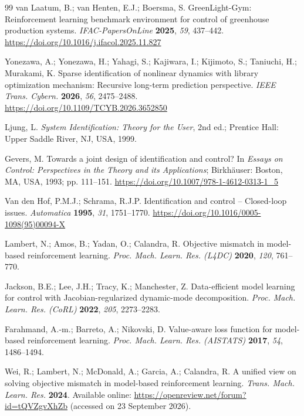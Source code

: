 \begin{thebibliography}{99}
van Laatum, B.; van Henten, E.J.; Boersma, S. GreenLight-Gym: Reinforcement learning
benchmark environment for control of greenhouse production systems.
\textit{IFAC-PapersOnLine} \textbf{2025}, \textit{59}, 437--442.
\url{https://doi.org/10.1016/j.ifacol.2025.11.827}

Yonezawa, A.; Yonezawa, H.; Yahagi, S.; Kajiwara, I.; Kijimoto, S.; Taniuchi, H.;
Murakami, K. Sparse identification of nonlinear dynamics with library optimization mechanism:
Recursive long-term prediction perspective. \textit{IEEE Trans. Cybern.} \textbf{2026},
\textit{56}, 2475--2488. \url{https://doi.org/10.1109/TCYB.2026.3652850}

Ljung, L. \textit{System Identification: Theory for the User}, 2nd ed.; Prentice Hall:
Upper Saddle River, NJ, USA, 1999.

Gevers, M. Towards a joint design of identification and control? In \textit{Essays on
Control: Perspectives in the Theory and its Applications}; Birkh\"auser: Boston, MA, USA,
1993; pp. 111--151. \url{https://doi.org/10.1007/978-1-4612-0313-1_5}

Van den Hof, P.M.J.; Schrama, R.J.P. Identification and control -- Closed-loop issues.
\textit{Automatica} \textbf{1995}, \textit{31}, 1751--1770.
\url{https://doi.org/10.1016/0005-1098(95)00094-X}

Lambert, N.; Amos, B.; Yadan, O.; Calandra, R. Objective mismatch in model-based
reinforcement learning. \textit{Proc. Mach. Learn. Res. (L4DC)} \textbf{2020}, \textit{120},
761--770.

Jackson, B.E.; Lee, J.H.; Tracy, K.; Manchester, Z. Data-efficient model learning for
control with Jacobian-regularized dynamic-mode decomposition.
\textit{Proc. Mach. Learn. Res. (CoRL)} \textbf{2022}, \textit{205}, 2273--2283.

Farahmand, A.-m.; Barreto, A.; Nikovski, D. Value-aware loss function for model-based
reinforcement learning. \textit{Proc. Mach. Learn. Res. (AISTATS)} \textbf{2017},
\textit{54}, 1486--1494.

Wei, R.; Lambert, N.; McDonald, A.; Garcia, A.; Calandra, R. A unified view on solving
objective mismatch in model-based reinforcement learning. \textit{Trans. Mach. Learn. Res.}
\textbf{2024}. Available online: \url{https://openreview.net/forum?id=tQVZgvXhZb}
(accessed on 23 September 2026).


\end{thebibliography}
